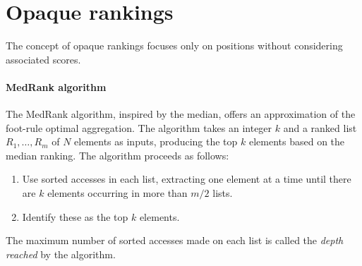 \section{Opaque rankings}

The concept of opaque rankings focuses only on positions without considering associated scores.

\paragraph*{MedRank algorithm}
The MedRank algorithm, inspired by the median, offers an approximation of the foot-rule optimal aggregation.
The algorithm takes an integer $k$ and a ranked list $R_1,\dots,R_m$ of $N$ elements as inputs, producing the top $k$ elements based on the median ranking.
The algorithm proceeds as follows:
\begin{enumerate}
    \item Use sorted accesses in each list, extracting one element at a time until there are $k$ elements occurring in more than $m/2$ lists.
    \item Identify these as the top $k$ elements.
\end{enumerate}
\begin{definition}
    The maximum number of sorted accesses made on each list is called the \emph{depth reached} by the algorithm. 
\end{definition}
